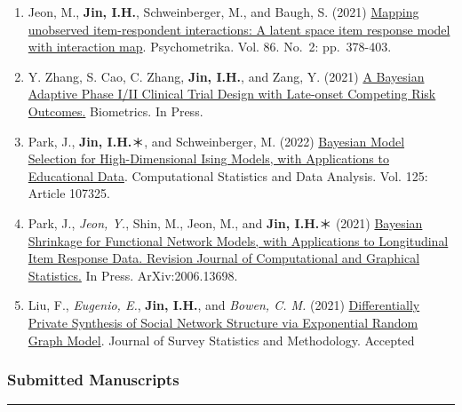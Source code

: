 \documentclass[
]{book}
\begin{document}
\begin{enumerate}
\item
  Jeon, M., \textbf{Jin, I.H.}, Schweinberger, M., and Baugh, S. (2021) \href{https://arxiv.org/abs/2007.08719}{Mapping unobserved item-respondent interactions: A latent space item response model with interaction map}. Psychometrika. Vol. 86. No.~2: pp.~378-403.
\item
  Y. Zhang, S. Cao, C. Zhang, \textbf{Jin, I.H.}, and Zang, Y. (2021) \href{https://doi.org/10.1111/biom.13347}{A Bayesian Adaptive Phase I/II Clinical Trial Design with Late-onset Competing Risk Outcomes.} Biometrics. In Press.
\item
  Park, J., \textbf{Jin, I.H.}＊, and Schweinberger, M. (2022) \href{https://arxiv.org/abs/1911.07142}{Bayesian Model Selection for High-Dimensional Ising Models, with Applications to Educational Data}. Computational Statistics and Data Analysis. Vol. 125: Article 107325.
\item
  Park, J., \emph{Jeon, Y.}, Shin, M., Jeon, M., and \textbf{Jin, I.H.}＊ (2021) \href{https://arxiv.org/abs/2006.13698}{Bayesian Shrinkage for Functional Network Models, with Applications to Longitudinal Item Response Data. Revision Journal of Computational and Graphical Statistics.} In Press. ArXiv:2006.13698.
\item
  Liu, F., \emph{Eugenio, E.}, \textbf{Jin, I.H.}, and \emph{Bowen, C. M.} (2021) \href{https://www.osti.gov/biblio/1668697}{Differentially Private Synthesis of Social Network Structure via Exponential Random Graph Model}. Journal of Survey Statistics and Methodology. Accepted
\end{enumerate}

\hypertarget{submitted-manuscripts}{%
\subsubsection*{Submitted Manuscripts}\label{submitted-manuscripts}}

\begin{center}\rule{0.5\linewidth}{0.5pt}\end{center}
\end{document}
